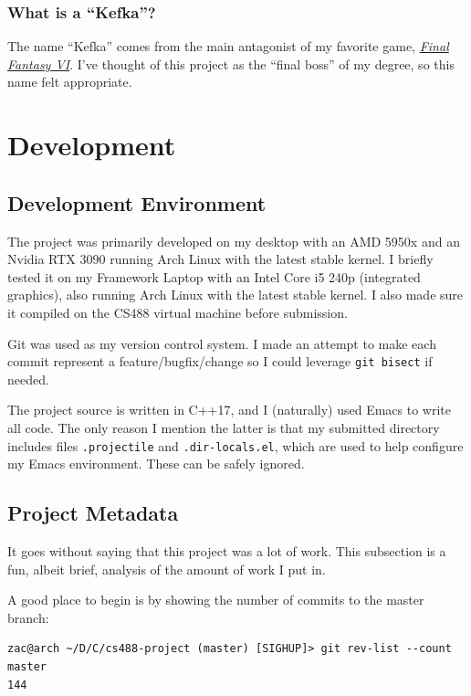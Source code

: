 \documentclass {article}
\begin{document}
\subsubsection{What is a ``Kefka''?}
The name ``Kefka'' comes from the main antagonist of my favorite game, \href{https://en.wikipedia.org/wiki/Final_Fantasy_VI}{\textit{Final Fantasy VI}}. I've thought of this project as the ``final boss'' of my degree, so this name felt appropriate.

\section{Development}
\subsection{Development Environment}\label{sec:devenv}
The project was primarily developed on my desktop with an AMD 5950x and an Nvidia RTX 3090 running Arch Linux with the latest stable kernel. I briefly tested it on my Framework Laptop with an Intel Core i5 240p (integrated graphics), also running Arch Linux with the latest stable kernel. I also made sure it compiled on the CS488 virtual machine before submission.

Git was used as my version control system. I made an attempt to make each commit represent a feature/bugfix/change so I could leverage \texttt{git bisect} if needed.

The project source is written in C++17, and I (naturally) used Emacs to write all code. The only reason I mention the latter is that my submitted directory includes files \texttt{.projectile} and \texttt{.dir-locals.el}, which are used to help configure my Emacs environment. These can be safely ignored.

\subsection{Project Metadata}
It goes without saying that this project was a lot of work. This subsection is a fun, albeit brief, analysis of the amount of work I put in.

A good place to begin is by showing the number of commits to the master branch:
\begin{verbatim}
zac@arch ~/D/C/cs488-project (master) [SIGHUP]> git rev-list --count master
144
\end{verbatim}
\end{document}
